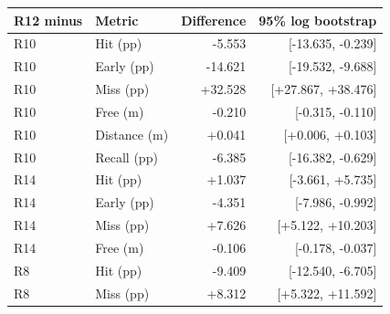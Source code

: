 \begin{tabular}{llrr}
\toprule
R12 minus & Metric & Difference & 95\% log bootstrap \\
\midrule
R10 & Hit (pp) & -5.553 & [-13.635, -0.239] \\
R10 & Early (pp) & -14.621 & [-19.532, -9.688] \\
R10 & Miss (pp) & +32.528 & [+27.867, +38.476] \\
R10 & Free (m) & -0.210 & [-0.315, -0.110] \\
R10 & Distance (m) & +0.041 & [+0.006, +0.103] \\
R10 & Recall (pp) & -6.385 & [-16.382, -0.629] \\
R14 & Hit (pp) & +1.037 & [-3.661, +5.735] \\
R14 & Early (pp) & -4.351 & [-7.986, -0.992] \\
R14 & Miss (pp) & +7.626 & [+5.122, +10.203] \\
R14 & Free (m) & -0.106 & [-0.178, -0.037] \\
R8 & Hit (pp) & -9.409 & [-12.540, -6.705] \\
R8 & Miss (pp) & +8.312 & [+5.322, +11.592] \\
\bottomrule
\end{tabular}
